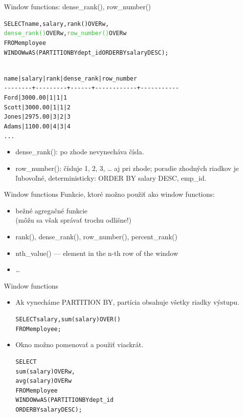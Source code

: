 \documentclass[12pt]{beamer}
\def\blue#1{\textcolor{Cerulean}{#1}}
\def\green#1{\textcolor{LimeGreen}{#1}}
\begin{document}
\begin{frame}[fragile]{Window functions: dense\_rank(), row\_number()}
\footnotesize
\begin{alltt}
SELECT name, salary, rank() OVER \blue{w},
       \green{dense_rank()} OVER \blue{w}, \green{row_number()} OVER \blue{w}
FROM employee
WINDOW \blue{w} AS (PARTITION BY dept_id ORDER BY salary DESC);
\end{alltt}
\begin{alltt}
\blue{
  name  | salary  | rank | dense_rank | row_number
-{}-{}-{}-{}-{}-{}-{}-{}+-{}-{}-{}-{}-{}-{}-{}-{}-{}+-{}-{}-{}-{}-{}-{}+-{}-{}-{}-{}-{}-{}-{}-{}-{}-{}-{}-{}+-{}-{}-{}-{}-{}-{}-{}-{}-{}-{}-{}
 Ford   | 3000.00 |    1 |          1 |          1
 Scott  | 3000.00 |    1 |          1 |          \alert{2}
 Jones  | 2975.00 |    3 |          \alert{2} |          3
 Adams  | 1100.00 |    4 |          3 |          4
 ...
}
\end{alltt}
\scriptsize
\begin{itemize}
\item dense\_rank(): po zhode nevynecháva čísla.
\item row\_number(): čísluje 1, 2, 3, \dots{} aj pri zhode; poradie zhodných riadkov
  je ľubovoľné, deterministicky: ORDER BY salary DESC, emp\_id.
\end{itemize}
\end{frame}

\begin{frame}[fragile]{Window functions}
Funkcie, ktoré možno použiť ako window functions:
\begin{itemize}
\item bežné agregačné funkcie\\
    (môžu sa však správať trochu odlišne!)
\item rank(), dense\_rank(), row\_number(), percent\_rank()
\item nth\_value() --- element in the n-th row of the window
\item \dots
\end{itemize}
\end{frame}

\begin{frame}[fragile]{Window functions}
\begin{itemize}
\item Ak vynecháme PARTITION BY, partícia obsahuje všetky riadky výstupu.
\begin{alltt}
    SELECT salary, sum(salary) \alert{OVER ()}
    FROM employee;
\end{alltt}
\vspace*{4mm}
\pause
\item Okno možno pomenovať a použiť viackrát.
\begin{alltt}
    SELECT
        sum(salary) OVER \blue{w},
        avg(salary) OVER \blue{w}
    FROM employee
    \alert{WINDOW \blue{w} AS (PARTITION BY dept_id
                ORDER BY salary DESC);
}
\end{alltt}
\end{itemize}
\end{frame}
\end{document}
